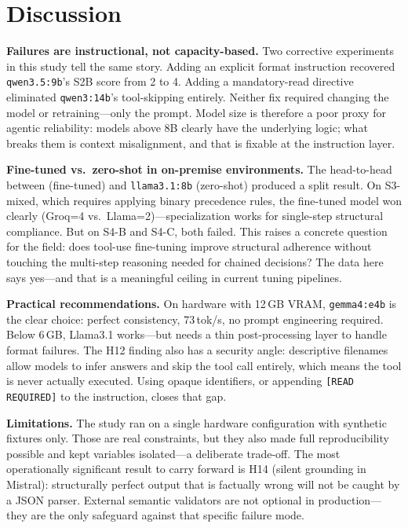 \documentclass{kdmile}
\begin{document}
\section{Discussion}
\label{sec:discussion}

\textbf{Failures are instructional, not capacity-based.}
Two corrective experiments in this study tell the same story.
Adding an explicit format instruction recovered \texttt{qwen3.5:9b}'s S2B score
from 2 to 4. Adding a mandatory-read directive eliminated \texttt{qwen3:14b}'s
tool-skipping entirely.
Neither fix required changing the model or retraining—only the prompt.
Model size is therefore a poor proxy for agentic reliability: models above 8B
clearly have the underlying logic; what breaks them is context misalignment,
and that is fixable at the instruction layer.

\textbf{Fine-tuned vs.\ zero-shot in on-premise environments.}
The head-to-head between  (fine-tuned) and
\texttt{llama3.1:8b} (zero-shot) produced a split result.
On S3-mixed, which requires applying binary precedence rules, the fine-tuned
model won clearly (Groq=4 vs.\ Llama=2)—specialization works for single-step
structural compliance.
But on S4-B and S4-C, both failed.
This raises a concrete question for the field: does tool-use fine-tuning improve
structural adherence without touching the multi-step reasoning needed for chained
decisions? The data here says yes—and that is a meaningful ceiling in current
tuning pipelines.

\textbf{Practical recommendations.}
On hardware with 12\,GB VRAM, \texttt{gemma4:e4b} is the clear choice: perfect
consistency, 73\,tok/s, no prompt engineering required.
Below 6\,GB, Llama3.1 works—but needs a thin post-processing layer to handle
format failures.
The H12 finding also has a security angle: descriptive filenames allow models
to infer answers and skip the tool call entirely, which means the tool is never
actually executed.
Using opaque identifiers, or appending \texttt{[READ REQUIRED]} to the instruction,
closes that gap.

\textbf{Limitations.}
The study ran on a single hardware configuration with synthetic fixtures only.
Those are real constraints, but they also made full reproducibility possible
and kept variables isolated—a deliberate trade-off.
The most operationally significant result to carry forward is H14 (silent
grounding in Mistral): structurally perfect output that is factually wrong
will not be caught by a JSON parser.
External semantic validators are not optional in production—they are the only
safeguard against that specific failure mode.
\end{document}

